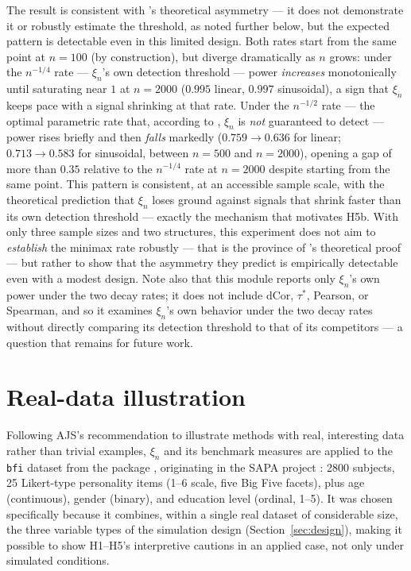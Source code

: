 \documentclass[article]{ajs}
\begin{document}
The result is consistent with \citet{auddy2024}'s theoretical
asymmetry --- it does not demonstrate it or robustly estimate the
threshold, as noted further below, but the expected pattern is
detectable even in this limited design. Both rates start from the same
point at $n=100$ (by construction), but diverge dramatically as $n$
grows: under the $n^{-1/4}$ rate --- $\xi_n$'s own detection threshold
--- power \emph{increases} monotonically until saturating near $1$ at
$n=2000$ ($0.995$ linear, $0.997$ sinusoidal), a sign that $\xi_n$
keeps pace with a signal shrinking at that rate. Under the $n^{-1/2}$
rate --- the optimal parametric rate that, according to
\citet{auddy2024}, $\xi_n$ is \emph{not} guaranteed to detect --- power
rises briefly and then \emph{falls} markedly ($0.759 \to 0.636$ for
linear; $0.713 \to 0.583$ for sinusoidal, between $n=500$ and
$n=2000$), opening a gap of more than $0.35$ relative to the
$n^{-1/4}$ rate at $n=2000$ despite starting from the same point. This
pattern is consistent, at an accessible sample scale, with the
theoretical prediction that $\xi_n$ loses ground against signals that
shrink faster than its own detection threshold --- exactly the
mechanism that motivates H5b. With only three sample sizes and two
structures, this experiment does not aim to \emph{establish} the
minimax rate robustly --- that is the province of \citet{auddy2024}'s
theoretical proof --- but rather to show that the asymmetry they
predict is empirically detectable even with a modest design. Note also
that this module reports only $\xi_n$'s own power under the two decay
rates; it does not include dCor, $\tau^\ast$, Pearson, or Spearman, and
so it examines $\xi_n$'s own behavior under the two decay rates without
directly comparing its detection threshold to that of its
competitors --- a question that remains for future work.

\section{Real-data illustration} \label{sec:realdata}

Following AJS's recommendation to illustrate methods with real,
interesting data rather than trivial examples, $\xi_n$ and its
benchmark measures are applied to the \texttt{bfi} dataset from the
 package \citep{revelle2024psych}, originating in the SAPA
project \citep{revelle2010sapa}: 2800 subjects, 25 Likert-type
personality items (1--6 scale, five Big Five facets), plus age
(continuous), gender (binary), and education level (ordinal, 1--5). It
was chosen specifically because it combines, within a single real
dataset of considerable size, the three variable types of the
simulation design (Section~\ref{sec:design}), making it possible to
show H1--H5's interpretive cautions in an applied case, not only under
simulated conditions.
\end{document}
